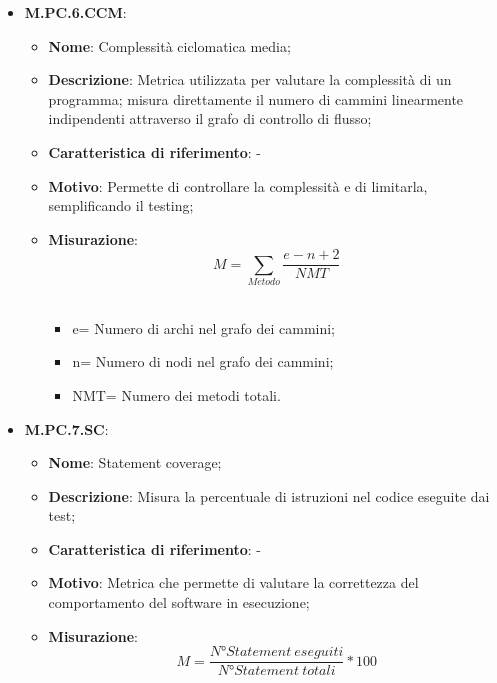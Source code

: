 \documentclass[10pt, a4paper]{article}
\begin{document}
\begin{itemize}
  \item \textbf{M.PC.6.CCM}:
    \begin{itemize}
        \item \textbf{Nome}: Complessità ciclomatica media;
        \item \textbf{Descrizione}: Metrica utilizzata per valutare la complessità di un programma; misura direttamente il numero di cammini linearmente indipendenti attraverso il grafo di controllo di flusso;
        \item \textbf{Caratteristica di riferimento}: -
        \item \textbf{Motivo}: Permette di controllare la complessità e di limitarla, semplificando il testing;
        \item \textbf{Misurazione}: \[ M=\sum_{Metodo} \frac{e-n+2}{NMT} \] \\
         \begin{itemize}
        \item e= Numero di archi nel grafo dei cammini;
        \item n= Numero di nodi nel grafo dei cammini;
        \item NMT= Numero dei metodi totali.\\
        \end{itemize}
   \end{itemize}
   
    \item \textbf{M.PC.7.SC}:
    \begin{itemize}
        \item \textbf{Nome}: Statement coverage;
        \item \textbf{Descrizione}: Misura la percentuale di istruzioni nel codice eseguite dai test;
        \item \textbf{Caratteristica di riferimento}: -
        \item \textbf{Motivo}: Metrica che permette di valutare la correttezza del comportamento del software in esecuzione;
        \item \textbf{Misurazione}:  \[M=\frac{N° Statement
        \ eseguiti}{N° Statement\ totali} * 100 \] \\
    \end{itemize}




\end{itemize}
\end{document}

